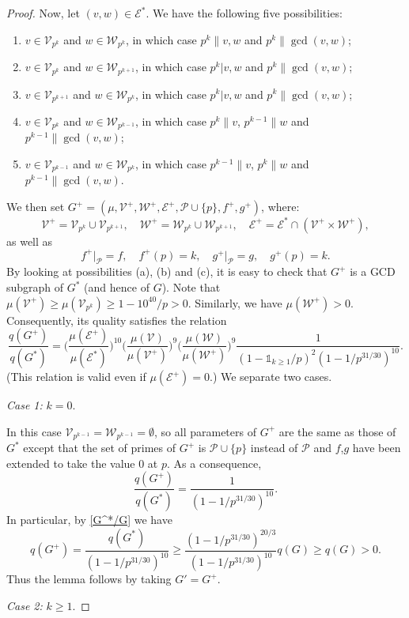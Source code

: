 \documentclass[12pt]{amsart}
\numberwithin{equation}{section}
\theoremstyle{definition}
\theoremstyle{remark}
\newcommand{\CE}{\mathcal{E}}
\newcommand{\CP}{\mathcal{P}}
\newcommand{\CV}{\mathcal{V}}
\newcommand{\CW}{\mathcal{W}}
\newcommand{\un}{\mathds{1}}
\renewcommand{\ge}{\geqslant}
\begin{document}
\begin{proof}
Now, let $(v,w)\in\CE^*$. We have the following five possibilities: 
\begin{enumerate}
\item $v\in\CV_{p^k}$ and $w\in\CW_{p^k}$, in which case $p^k\|v,w$ and $p^k\|\gcd(v,w)$;
\item $v\in\CV_{p^k}$ and $w\in\CW_{p^{k+1}}$, in which case $p^k|v,w$ and $p^k\|\gcd(v,w)$;
\item $v\in\CV_{p^{k+1}}$ and $w\in\CW_{p^k}$, in which case $p^k|v,w$ and $p^k\|\gcd(v,w)$;
\item $v\in\CV_{p^k}$ and $w\in\CW_{p^{k-1}}$, in which case $p^k\|v$, $p^{k-1}\|w$ and $p^{k-1}\|\gcd(v,w)$;
\item $v\in\CV_{p^{k-1}}$ and $w\in\CW_{p^k}$, in which case $p^{k-1}\|v$, $p^k\|w$ and $p^{k-1}\|\gcd(v,w)$.
\end{enumerate}
We then set $G^+=(\mu,\CV^+,\CW^+,\CE^+,\CP\cup\{p\},f^+,g^+)$, where:
\[
\CV^+=\CV_{p^k}\cup\CV_{p^{k+1}},
\quad
\CW^+=\CW_{p^k}\cup\CW_{p^{k+1}},
\quad
\CE^+=\CE^*\cap(\CV^+\times \CW^+),
\]
as well as
\[
f^+\big|_\CP=f,
\quad
f^+(p)=k,
\quad
g^+\big|_{\CP}=g,
\quad
g^+(p)=k .
\]
By looking at possibilities (a), (b) and (c), it is easy to check that $G^+$ is a GCD subgraph of $G^*$ (and hence of $G$). Note that $\mu(\CV^+)\ge \mu(\CV_{p^k})\ge 1-10^{40}/p>0$. Similarly, we have $\mu(\CW^+)>0$. Consequently, its quality satisfies the relation
\[
\frac{q(G^+)}{q(G^*)} =
	\bigg(\frac{\mu(\CE^+)}{\mu(\CE^*)}\bigg)^{10} 
	\bigg( \frac{\mu(\CV)}{\mu(\CV^+)}\bigg)^{9}
	 \bigg( \frac{\mu(\CW)}{\mu(\CW^+)}\bigg)^{9}
		\frac{1}{(1-\un_{k\ge1}/p)^2(1-1/p^{31/30})^{10}} .	
\]
(This relation is valid even if $\mu(\CE^+)=0$.) We separate two cases.

\bigskip

\noindent 
{\it Case 1:} $k=0$. 

\medskip

In this case $\CV_{p^{k-1}}=\CW_{p^{k-1}}=\emptyset$, so all parameters of $G^+$ are the same as those of $G^*$ except that the set of primes of $G^+$ is $\CP\cup\{p\}$ instead of $\CP$ and $f$,$g$ have been extended to take the value 0 at $p$. As a consequence, 
\[
\frac{q(G^+)}{q(G^*)} =
		\frac{1}{(1-1/p^{31/30})^{10}} .	
\]
In particular, by \eqref{G^*/G} we have
\[
q(G^+)=\frac{q(G^*)}{(1-1/p^{31/30})^{10}} \ge \frac{(1-1/p^{31/30})^{20/3}}{(1-1/p^{31/30})^{10}} q(G)\ge q(G)>0 .
\]
Thus the lemma follows by taking $G'=G^+$.


\bigskip

\noindent 
{\it Case 2:} $k\ge1$. 



\end{proof}
\end{document}
